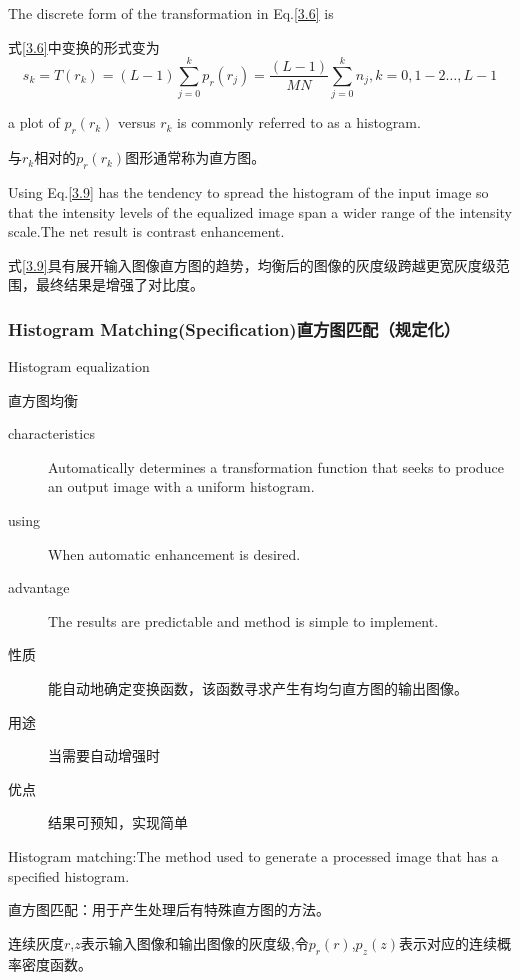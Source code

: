 \documentclass[a4paper,12pt]{article}
\numberwithin{equation}{section}%
\begin{document}
The discrete form of the transformation in Eq.\ref{3.6} is

式\ref{3.6}中变换的形式变为
\begin{equation} \label {3.9}
s_{k}=T(r_{k})=(L-1)\sum_{j=0}^{k}p_{r}(r_{j})=\frac{(L-1)}{MN}\sum_{j=0}^{k}{n_{j}},k=0,1-2\ldots,L-1
\end{equation}

a plot of $p_{r}(r_{k})$ versus $r_{k}$ is commonly referred to as a histogram.

与$r_{k}$相对的$p_{r}(r_{k})$图形通常称为直方图。

Using Eq.\ref{3.9} has the tendency to spread the histogram of the input image so that the intensity levels of the equalized image span a wider range of the intensity scale.The net result is contrast enhancement.

式\ref{3.9}具有展开输入图像直方图的趋势，均衡后的图像的灰度级跨越更宽灰度级范围，最终结果是增强了对比度。
\subsubsection{Histogram Matching(Specification)直方图匹配（规定化）}
Histogram equalization 

直方图均衡

\begin{description}
\item[characteristics]Automatically determines a transformation function that seeks to produce an output image with a uniform histogram.
\item[using]When automatic enhancement is desired.
\item[advantage]The results are predictable and method is simple to implement.
\end{description}

\begin{description}
\item[性质]能自动地确定变换函数，该函数寻求产生有均匀直方图的输出图像。
\item[用途]当需要自动增强时
\item[优点]结果可预知，实现简单
\end{description}

Histogram matching:The method used to generate a processed image that has a specified histogram.

直方图匹配：用于产生处理后有特殊直方图的方法。



连续灰度$r$,$z$表示输入图像和输出图像的灰度级,令$p_{r}(r)$,$p_{z}(z)$表示对应的连续概率密度函数。
\end{document}
